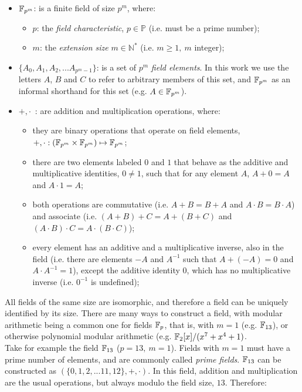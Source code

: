 \begin{itemize}
\item $\mathbb{F}_{p^m}$: is a finite field of size $p^m$, where:
    \begin{itemize}
    \item $p$: the \emph{field characteristic}, $p \in \mathbb{P}$ (i.e. must be a prime number);
    \item $m$: the \emph{extension size} $m \in \mathbb{N^*}$ (i.e. $m \geq 1,~m$ integer);
    \end{itemize}
\item $\{A_0, A_1, A_2, ... A_{p^m-1}\}$: is a set of $p^m$ \emph{field elements}. In this work we use the letters $A$, $B$ and $C$ to refer to arbitrary members of this set, and $\mathbb{F}_{p^m}$ as an informal shorthand for this set (e.g. $A \in \mathbb{F}_{p^m}$).
\item $+, \cdot$~: are addition and multiplication operations, where:
    \begin{itemize}
    \item they are binary operations that operate on field elements, $+, \cdot : (\mathbb{F}_{p^m} \times \mathbb{F}_{p^m}) \mapsto \mathbb{F}_{p^m}$;
    \item there are two elements labeled $0$ and $1$ that behave as the additive and multiplicative identities, $0 \neq 1$, such that for any element $A$, $A + 0 = A$ and $A \cdot 1 = A$;
    \item both operations are commutative (i.e. $A + B = B + A$ and $A \cdot B = B \cdot A$) and associate (i.e. $(A + B) + C = A + (B + C)$ and $(A \cdot B) \cdot C = A \cdot (B \cdot C)$);
    \item every element has an additive and a multiplicative inverse, also in the field (i.e. there are elements $-A$ and $A^{-1}$ such that $A + (-A) = 0$ and $A \cdot A^{-1} = 1$), except the additive identity $0$, which has no multiplicative inverse (i.e. $0^{-1}$ is undefined);
    \end{itemize}
\end{itemize}

All fields of the same size are isomorphic, and therefore a field can be uniquely identified by its size. There are many ways to construct a field, with modular arithmetic being a common one for fields $\mathbb{F}_p$, that is, with $m=1$ (e.g. $\mathbb{F}_{13}$), or otherwise polynomial modular arithmetic (e.g. $\mathbb{F}_{2}[x]/(x^7+x^4+1)$.\\

Take for example the field $\mathbb{F}_{13}$ ($p=13,~m=1$). Fields with $m=1$ must have a prime number of elements, and are commonly called \emph{prime fields}. $\mathbb{F}_{13}$ can be constructed as $(\{0, 1, 2, ... 11, 12\}, +, \cdot)$. In this field, addition and multiplication are the usual operations, but always modulo the field size, $13$. Therefore:

